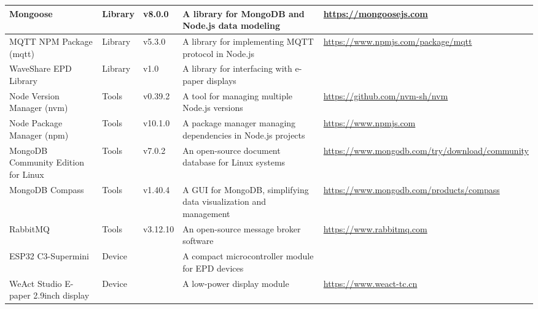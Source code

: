 \documentclass[../Main.tex]{subfiles}
\begin{document}
\begin{table}[H]
\begin{tabular}{| m{3cm} | m{1cm} | m{1.4cm} | m{4cm} | m{4cm} |}
        Mongoose                                & Library       & v8.0.0            & A library for MongoDB and Node.js data modeling                   & \url{https://mongoosejs.com}                                      \\ \hline
        MQTT NPM Package (mqtt)                 & Library       & v5.3.0            & A library for implementing MQTT protocol in Node.js               & \url{https://www.npmjs.com/package/mqtt}                          \\ \hline
        WaveShare \gls{EPD} Library                   & Library       & v1.0              & A library for interfacing with e-paper displays                   &                                                                   \\ \hline
        Node Version Manager (nvm)              & Tools         & v0.39.2           & A tool for managing multiple Node.js versions                     & \url{https://github.com/nvm-sh/nvm}                               \\ \hline
        Node Package Manager (npm)              & Tools         & v10.1.0           & A package manager managing dependencies in Node.js projects       & \url{https://www.npmjs.com}                                       \\ \hline
        MongoDB Community Edition for Linux     & Tools         & v7.0.2            & An open-source document database for Linux systems                & \url{https://www.mongodb.com/try/download/community}              \\ \hline
        MongoDB Compass                         & Tools         & v1.40.4           & A GUI for MongoDB, simplifying data visualization and management  & \url{https://www.mongodb.com/products/compass}                    \\ \hline
        RabbitMQ                                & Tools         & v3.12.10          & An open-source message broker software                            & \url{https://www.rabbitmq.com}                                    \\ \hline
        ESP32 C3-Supermini                      & Device        &                   & A compact microcontroller module for \gls{EPD} devices                  &                                                                   \\ \hline
        WeAct Studio E-paper 2.9inch display    & Device        &                   & A low-power display module                                        & \url{https://www.weact-tc.cn}                                     \\ \hline

\end{tabular}
\end{table}
\end{document}
